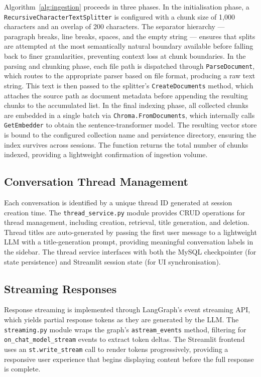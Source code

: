 \documentclass[12pt,a4paper]{article}
\begin{document}
Algorithm~\ref{alg:ingestion} proceeds in three phases. In the initialisation phase, a \\ \texttt{RecursiveCharacterTextSplitter} is configured with a chunk size of 1,000 characters and an overlap of 200 characters. The separator hierarchy — paragraph breaks, line breaks, spaces, and the empty string — ensures that splits are attempted at the most semantically natural boundary available before falling back to finer granularities, preventing context loss at chunk boundaries. In the parsing and chunking phase, each file path is dispatched through \texttt{ParseDocument}, which routes to the appropriate parser based on file format, producing a raw text string. This text is then passed to the splitter's \texttt{CreateDocuments} method, which attaches the source path as document metadata before appending the resulting chunks to the accumulated list. In the final indexing phase, all collected chunks are embedded in a single batch via \texttt{Chroma.FromDocuments}, which internally calls \texttt{GetEmbedder} to obtain the sentence-transformer model. The resulting vector store is bound to the configured collection name and persistence directory, ensuring the index survives across sessions. The function returns the total number of chunks indexed, providing a lightweight confirmation of ingestion volume.



\subsection{Conversation Thread Management}
\label{subsec:thread_management}

Each conversation is identified by a unique thread ID generated at session creation time. The \texttt{thread\_service.py} module provides CRUD operations for thread management, including creation, retrieval, title generation, and deletion. Thread titles are auto-generated by passing the first user message to a lightweight LLM with a title-generation prompt, providing meaningful conversation labels in the sidebar. The thread service interfaces with both the MySQL checkpointer (for state persistence) and Streamlit session state (for UI synchronisation).

\subsection{Streaming Responses}
\label{subsec:streaming}

Response streaming is implemented through LangGraph's event streaming API, which yields partial response tokens as they are generated by the LLM. The \texttt{streaming.py} module wraps the graph's \texttt{astream\_events} method, filtering for \texttt{on\_chat\_model\_stream} events to extract token deltas. The Streamlit frontend uses an \texttt{st.write\_stream} call to render tokens progressively, providing a responsive user experience that begins displaying content before the full response is complete.
\end{document}
